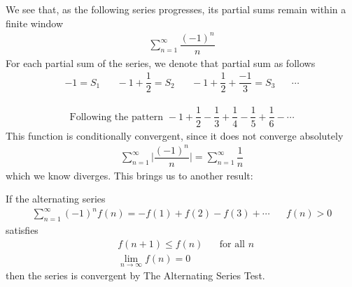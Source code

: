 \begin{example}
We see that, as the following series progresses, its partial sums remain within a finite window
\begin{align*}
    \sum_{n = 1}^{\infty} \dfrac{(-1)^{n}}{n}
\end{align*}
For each partial sum of the series, we denote that partial sum as follows
\begin{align*}
    -1 = S_{1} \hspace{20pt} -1 + \dfrac{1}{2} = S_{2} \hspace{20pt} -1 + \dfrac{1}{2} + \dfrac{-1}{3} = S_{3} \hspace{20pt} \cdots
\end{align*}
\begin{align*}
    \text{Following the pattern} \hspace{4pt} -1 + \dfrac{1}{2} - \dfrac{1}{3} + \dfrac{1}{4} - \dfrac{1}{5} + \dfrac{1}{6} - \cdots
\end{align*}
This function is conditionally convergent, since it does not converge absolutely
\begin{align*}
    \sum_{n=1}^{\infty} \Big\lvert \dfrac{(-1)^{n}}{n} \Big\rvert = \sum_{n=1}^{\infty} \dfrac{1}{n}
\end{align*}
which we know diverges. This brings us to another result:
\end{example}

\begin{theorem}
If the alternating series
\begin{align*}
    \sum_{n=1}^{\infty} (-1)^{n}f(n) = -f(1) + f(2) - f(3) + \cdots \hspace{20pt} f(n) > 0
\end{align*}
satisfies
\begin{align*}
    &f(n+1) \leq f(n) \hspace{20pt} \text{for all} \hspace{4pt} n\\[2ex]
    &\lim_{n \longrightarrow \infty} f(n) = 0
\end{align*}
then the series is convergent by The Alternating Series Test.
\end{theorem}

